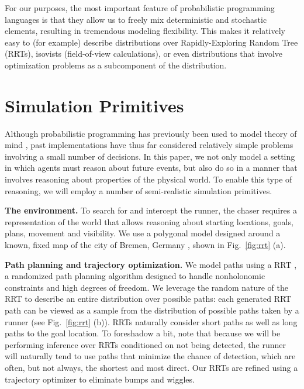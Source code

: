 \documentclass{article}
\begin{document}
For our purposes, the most important feature of probabilistic programming languages is that they allow us to freely mix deterministic and stochastic elements, resulting in tremendous modeling flexibility.  This makes it relatively easy to (for example) describe distributions over Rapidly-Exploring Random Tree (RRTs), isovists (field-of-view calculations), or even distributions that involve optimization problems as a subcomponent of the distribution.

\vspace{-0.25em}
\section{Simulation Primitives}

Although probabilistic programming has previously been used to model theory of mind \cite{stuhlmuller2014reasoning}, past implementations have thus far considered relatively simple problems involving a small number of decisions. In this paper, we not only model a setting in which agents must reason about future events, but also do so in a manner that involves reasoning about properties of the physical world. To enable this type of reasoning, we will employ a number of semi-realistic simulation primitives.

\textbf{The environment.}  To search for and intercept the runner, the
chaser requires a representation of the world that allows reasoning
about starting locations, goals, plans, movement and visibility. We
use a polygonal model designed around a known, fixed map of the city of
Bremen, Germany \cite{BremenPointCloud}, shown in Fig.~\ref{fig:rrt} (a).

\textbf{Path planning and trajectory optimization.}  We model paths
using a RRT
\cite{lavalle1998rapidly}, a randomized path planning algorithm
designed to handle nonholonomic constraints and high degrees of
freedom.  We leverage the random nature of the RRT to describe an
entire distribution over possible paths: each generated RRT path can
be viewed as a sample from the distribution of possible paths taken by
a runner (see Fig.~\ref{fig:rrt} (b)). RRTs naturally consider short
paths as well as long paths to the goal location. To foreshadow a bit,
note that because we will be performing inference over RRTs
conditioned on not being detected, the runner will naturally tend to
use paths that minimize the chance of detection, which are often, but
not always, the shortest and most direct.  Our RRTs are
refined using a trajectory optimizer to eliminate bumps
and wiggles.
\end{document}
